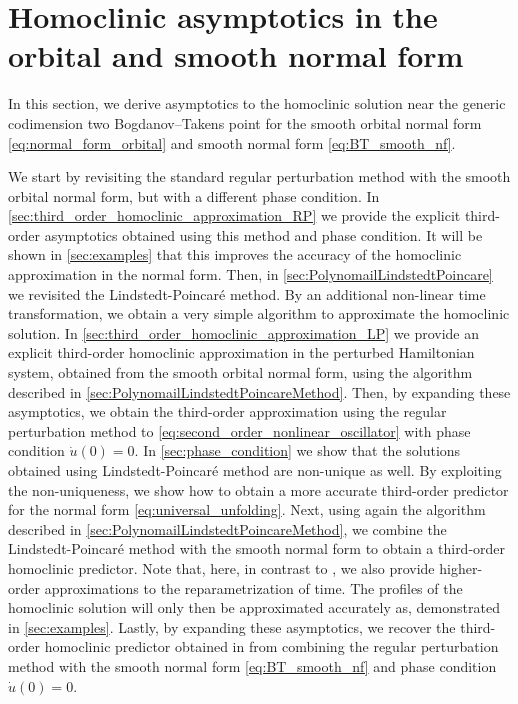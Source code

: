 \section{Homoclinic asymptotics in the orbital and smooth normal form}
\label{sec:asymptotics}

In this section, we derive asymptotics to the homoclinic solution near the
generic codimension two Bogdanov--Takens point for the smooth orbital normal
form \cref{eq:normal_form_orbital} and smooth normal form
\cref{eq:BT_smooth_nf}. 

We start by revisiting the standard regular perturbation method with the smooth
orbital normal form, but with a different phase condition. In
\cref{sec:third_order_homoclinic_approximation_RP} we provide the explicit
third-order asymptotics obtained using this method and phase condition. It will
be shown in \cref{sec:examples} that this improves the accuracy of the
homoclinic approximation in the normal form. Then, in
\cref{sec:PolynomailLindstedtPoincare} we revisited the Lindstedt-Poincar\'e
method. By an additional non-linear time transformation, we obtain a very
simple algorithm to approximate the homoclinic solution. In
\cref{sec:third_order_homoclinic_approximation_LP} we provide an explicit
third-order homoclinic approximation in the perturbed Hamiltonian system,
obtained from the smooth orbital normal form, using the algorithm described in
\cref{sec:PolynomailLindstedtPoincareMethod}. Then, by expanding these
asymptotics, we obtain the third-order approximation using the regular
perturbation method to \cref{eq:second_order_nonlinear_oscillator} with phase
condition $\dot u(0)=0$. In \cref{sec:phase_condition} we show that the
solutions obtained using Lindstedt-Poincar\'e method are non-unique as well. By
exploiting the non-uniqueness, we show how to obtain a more accurate
third-order predictor for the normal form \cref{eq:universal_unfolding}. Next,
using again the algorithm described in
\cref{sec:PolynomailLindstedtPoincareMethod}, we combine the
Lindstedt-Poincar\'e method with the smooth normal form to obtain a third-order
homoclinic predictor. Note that, here, in contrast to \cite{Al-Hdaibat2016}, we
also provide higher-order approximations to the reparametrization of time. The
profiles of the homoclinic solution will only then be approximated accurately
as, demonstrated in \cref{sec:examples}. Lastly, by expanding these
asymptotics, we recover the third-order homoclinic predictor obtained in
\cite{Al-Hdaibat2016} from combining the regular perturbation method with the
smooth normal form \cref{eq:BT_smooth_nf} and phase condition $\dot u(0)=0$.

